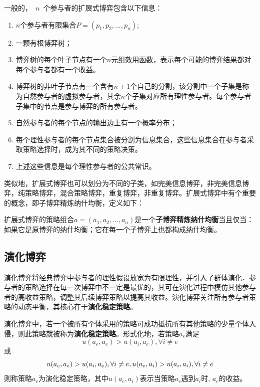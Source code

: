 \begin{definition}
一般的，~$n$~个参与者的扩展式博弈包含以下信息：
\begin{enumerate}
	\item $n$个参与者有限集合$P=(p_1,p_2,...,p_n)$;
	\item 一颗有根博弈树；
	\item 博弈树的每个叶子节点有一个$n$元组效用函数，表示每个可能的博弈结果都对每个参与者都有一个收益。
	\item 博弈树的非叶子节点有一个含有$n+1$个自己的分割，该分割中一个子集是称为自然参与者的虚拟参与者，其余$n$个子集对应所有理性参与者。每个参与者子集中的节点是参与博弈的所有参与者。
	
	\item 自然参与者的每个节点的输出边上有一个概率分布；
	\item 每个理性参与者的每个节点集合被分割为信息集合，这些信息集合在参与者采取策略选择时，成为其不同的策略决策。
	\item 上述这些信息是每个理性参与者的公共常识。
\end{enumerate}
\end{definition}

类似地，扩展式博弈也可以划分为不同的子类，如完美信息博弈，非完美信息博弈，纯策略博弈，混合策略博弈，重复博弈，非重复博弈。扩展式博弈中有个重要的概念，即子博弈精炼纳什均衡，定义如下：
\begin{definition}
扩展式博弈的策略组合$a=(a_1,a_2,...,a_n)$是一个\textbf{子博弈精炼纳什均衡}当且仅当：如果它是原博弈的纳什均衡；它在每一个子博弈上也都构成纳什均衡。
\end{definition}
\subsection{演化博弈}

演化博弈将经典博弈中参与者的理性假设放宽为有限理性，并引入了群体演化．参与者的策略选择在每一次博弈中不一定是最优的，其可在演化过程中模仿其他参与者的高收益策略，调整其后续博弈策略以提高其收益。演化博弈关注所有参与者策略的动态平衡，其核心在于\textbf{演化稳定策略}。

\begin{definition}
	演化博弈中，若一个被所有个体采用的策略可成功抵抗所有其他策略的少量个体入侵，则此策略就被称为\textbf{演化稳定策略}。形式化地，若策略$a_e$满足
	\begin{equation}
	u(a_e,a_e) > u(a_i,a_e), \forall i \ne e 
	\end{equation}
	或
	\begin{equation}
	u(a_e,a_e) > u(a_i,a_e), \forall i \ne e,\\
	u(a_e,a_i) > u(a_i,a_i), \forall i \ne e 
	\end{equation}
	则称策略$a_e$为演化稳定策略，其中$u(a_e,a_i)$表示当策略$a_e$遇到$a_i$时, $a_e$的收益。
	
\end{definition}


